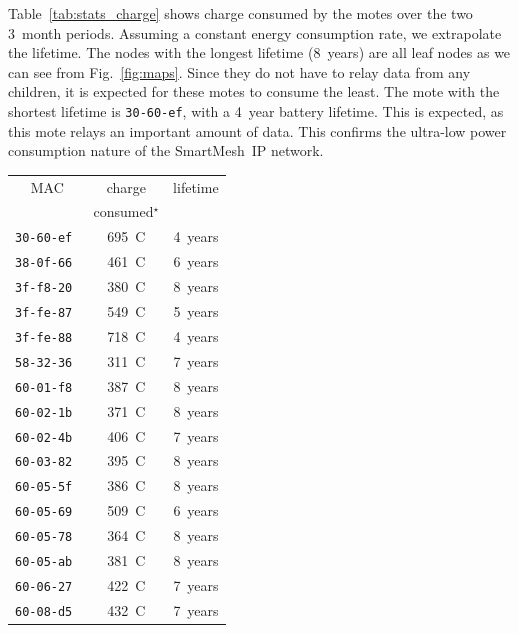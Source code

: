 \documentclass{elsarticle}
\newcommand{\smip}                {SmartMesh~IP\xspace}
\begin{document}

Table~\ref{tab:stats_charge} shows charge consumed by the motes over the two 3~month periods.
Assuming a constant energy consumption rate, we extrapolate the lifetime.
The nodes with the longest lifetime (8~years) are all leaf nodes as we can see from Fig.~\ref{fig:maps}.
Since they do not have to relay data from any children, it is expected for these motes to consume the least.
The mote with the shortest lifetime is {\tt 30-60-ef}, with a 4~year battery lifetime.
This is expected, as this mote relays an important amount of data.
This confirms the ultra-low power consumption nature of the \smip network.

\begin{table}
\begin{subtable}{.5\textwidth}
    \begin{tabular}{|c|c|r|}
        \toprule
        MAC           &  charge          & lifetime \\
                      & consumed$^\star$ &          \\
        \midrule
        \tt{30-60-ef} &            695~C &  4~years \\
        \tt{38-0f-66} &            461~C &  6~years \\
        \tt{3f-f8-20} &            380~C &  8~years \\
        \tt{3f-fe-87} &            549~C &  5~years \\
        \tt{3f-fe-88} &            718~C &  4~years \\
        \tt{58-32-36} &            311~C &  7~years \\
        \tt{60-01-f8} &            387~C &  8~years \\
        \tt{60-02-1b} &            371~C &  8~years \\
        \tt{60-02-4b} &            406~C &  7~years \\
        \tt{60-03-82} &            395~C &  8~years \\
        \tt{60-05-5f} &            386~C &  8~years \\
        \tt{60-05-69} &            509~C &  6~years \\
        \tt{60-05-78} &            364~C &  8~years \\
        \tt{60-05-ab} &            381~C &  8~years \\
        \tt{60-06-27} &            422~C &  7~years \\
        \tt{60-08-d5} &            432~C &  7~years \\

\end{tabular}
\end{subtable}
\end{table}
\end{document}
